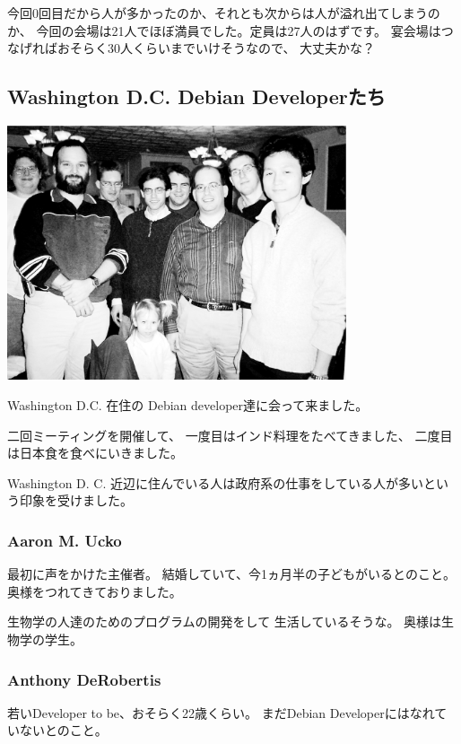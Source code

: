 \documentclass[mingoth]{jsarticle}
\begin{document}
	  今回0回目だから人が多かったのか、それとも次からは人が溢れ出てしまうのか、
	  今回の会場は21人でほぼ満員でした。定員は27人のはずです。
	  宴会場はつなげればおそらく30人くらいまでいけそうなので、
	  大丈夫かな？



\subsection{Washington D.C. Debian Developerたち}

\includegraphics[width=10cm]{image200502/washdc.eps}

Washington D.C. 在住の
Debian developer達に会って来ました。

二回ミーティングを開催して、
一度目はインド料理をたべてきました、
二度目は日本食を食べにいきました。

Washington D. C.
近辺に住んでいる人は政府系の仕事をしている人が多いという印象を受けました。


\subsubsection{Aaron M. Ucko}

最初に声をかけた主催者。
結婚していて、今1ヵ月半の子どもがいるとのこと。
奥様をつれてきておりました。

生物学の人達のためのプログラムの開発をして
生活しているそうな。
奥様は生物学の学生。


\subsubsection{Anthony DeRobertis}

若いDeveloper to be、おそらく22歳くらい。
まだDebian Developerにはなれていないとのこと。
\end{document}
